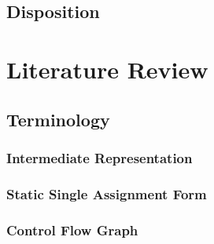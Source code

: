 \documentclass[12pt, a4paper]{article}
\begin{document}

\subsection{Disposition}



\section{Literature Review}


\subsection{Terminology}



\subsubsection{Intermediate Representation}


\subsubsection{Static Single Assignment Form}

\cite{ssa_decomp}



\subsubsection{Control Flow Graph}

\end{document}
